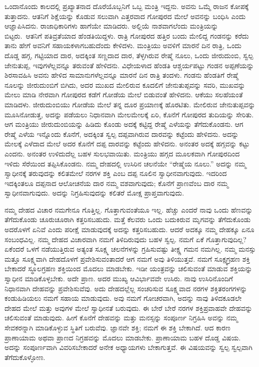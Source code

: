 ಒಂದಾನೊಂದು ಕಾಲದಲ್ಲಿ ಪ್ರಖ್ಯಾತನಾದ ದೊರೆಯೊಬ್ಬನಿಗೆ ಒಬ್ಬ ಮಂತ್ರಿ ಇದ್ದನು. ಅವನು ಒಮ್ಮೆ ರಾಜನ ಕೋಪಕ್ಕೆ ತುತ್ತಾದನು. ಆತನಿಗೆ ಶಿಕ್ಷೆಯನ್ನು ಕೊಡುವ ಸಲುವಾಗಿ ಎತ್ತರವಾದ ಗೋಪುರದ ಮೇಲೆ ಅವನನ್ನು ಬಂಧಿಸಿ ಎಂದು ಆಜ್ಞಾಪಿಸಿದನು. ರಾಜಾಧಿಕಾರಿಗಳು ಹಾಗೆಯೇ ಮಾಡಿದರು. ಅಲ್ಲಿಯೆ ನಾಶವಾಗಲೆಂದು ಮಂತ್ರಿಯನ್ನು ಬಿಟ್ಟರು.\break\ ಆತನಿಗೆ ಪತಿವ್ರತೆಯಾದ ಹೆಂಡತಿಯಿದ್ದಳು. ರಾತ್ರಿ ಗೋಪುರದ ಹತ್ತಿರ ಬಂದು ಮೇಲಿದ್ದ ಗಂಡನನ್ನು ಕರೆದು ತಾನು ಹೇಗೆ ಅವನಿಗೆ ಸಹಾಯಕಳಾಗಬಹುದೆಂದು ಕೇಳಿದಳು. ಮಂತ್ರಿಯು ಅವಳಿಗೆ ಮಾರನೆ ದಿನ ರಾತ್ರಿ, ಒಂದು ದೊಡ್ಡ ಹಗ್ಗ, ಗಟ್ಟಿಯಾದ ದಾರ, ಅದಕ್ಕಿಂತ ಸಣ್ಣದಾದ ದಾರ, ತೆಳ್ಳಗಿರುವ ರೇಷ್ಮೆ ನೂಲು, ಒಂದು ಜೀರುದುಂಬಿ, ಸ್ವಲ್ಪ ಜೇನುತುಪ್ಪ, ಇವುಗಳೆಲ್ಲವನ್ನೂ ತರುವಂತೆ ಹೇಳಿದನು. ವಿಧೇಯಳಾದ ಹೆಂಡತಿ ಆಶ್ಚರ್ಯಪಟ್ಟು ಗಂಡನ ಅಪ್ಪಣೆಯನ್ನು ಶಿರಸಾವಹಿಸಿ ಅವನು ಹೇಳಿದ ಸಾಮಾನುಗಳೆಲ್ಲವನ್ನೂ ಮಾರನೆ ದಿನ ರಾತ್ರಿ ತಂದಳು. ಗಂಡನು ಹೆಂಡತಿಗೆ ರೇಷ್ಮೆ ನೂಲನ್ನು ಜೀರುದುಂಬಿಗೆ ಬಿಗಿದು, ಅದರ ಮುಖದ ಮೇಲಿರುವ ಕೂದಲಿಗೆ ಜೇನುತುಪ್ಪವನ್ನು ಸವರಿ, ಮುಖವನ್ನು ಮೇಲು ಮಾಡಿ ನೇರವಾಗಿ ಗೋಪುರದ ಕಡೆಗೆ ಗೋಡೆಯ ಮೇಲೆ ಬಿಡುವಂತೆ ಹೇಳಿದನು. ಆಕೆಯು ಸಲಹೆಯಂತೆ ಮಾಡಿದಳು. ಜೀರುದುಂಬಿಯು ಗೋಡೆಯ ಮೇಲೆ ತನ್ನ ದೂರ ಪ್ರಯಾಣಕ್ಕೆ ಹೊರಟಿತು. ಮೇಲಿರುವ ಜೇನುತುಪ್ಪವನ್ನು ಮೂಸಿನೋಡುತ್ತ, ಅದನ್ನು ಪಡೆಯಲು ನಿಧಾನವಾಗಿ ಮೇಲಮೇಲಕ್ಕೆ ಏರಿ, ಕೊನೆಗೆ ಗೋಪುರದ ತುದಿಯನ್ನು ಸೇರಿತು. ಆಗ ಮಂತ್ರಿಯು ಜೀರುದುಂಬಿಯನ್ನು ಹಿಡಿದು ಕೊಂಡು ಅದಕ್ಕೆ ಕಟ್ಟಿದ್ದ ರೇಷ್ಮೆ ಎಳೆಯನ್ನು ತೆಗೆದುಕೊಂಡನು. ಆಗ ರೇಷ್ಮೆ ಎಳೆಯ ಇನ್ನೊಂದು ಕೊನೆಗೆ, ಅದಕ್ಕಿಂತ ಸ್ವಲ್ಪ ದಪ್ಪವಾಗಿರುವ ದಾರವನ್ನು ಕಟ್ಟೆಂದು ಹೇಳಿದನು. ಅದನ್ನು ಮೇಲಕ್ಕೆ ಎಳೆದಾದ ಮೇಲೆ ಅದರ ಕೊನೆಗೆ ದಪ್ಪ ದಾರವನ್ನು ಕಟ್ಟೆಂದು ಹೇಳಿದನು. ಅನಂತರ ಅದಕ್ಕೆ ಹಗ್ಗವನ್ನು ಕಟ್ಟು ಎಂದನು. ಅನಂತರ ಉಳಿದುದೆಲ್ಲ ಬಹಳ ಸುಲಭವಾಯಿತು. ಮಂತ್ರಿಯು ಹಗ್ಗದ ಮೂಲಕವಾಗಿ ಗೋಪುರದಿಂದ ಇಳಿದು ಸೆರೆಯಿಂದ ತಪ್ಪಿಸಿಕೊಂಡನು. ನಮ್ಮ ದೇಹದಲ್ಲಿ ಉಸಿರಿನ ಚಲನೆಯೇ “ರೇಷ್ಮೆಯ ನೂಲು.” ಅದನ್ನು ನಮ್ಮ ಸ್ವಾಧೀನಕ್ಕೆ ತರುವುದನ್ನು ಕಲಿತಮೇಲೆ ನರಗಳ ಶಕ್ತಿ ಎಂಬ ದಪ್ಪ ನೂಲಿನ ಸ್ವಾಧೀನವಾಗುವುದು. ಇದರಿಂದ ಇದಕ್ಕಿಂತಲೂ ದಪ್ಪನಾದ ಆಲೋಚನೆಯ ದಾರ ನಮ್ಮ ವಶವಾಗುವುದು; ಕೊನೆಗೆ ಪ್ರಾಣವೆಂಬ ದಾರ ನಮ್ಮ ಸ್ವಾಧೀನವಾಗುವುದು. ಅದನ್ನು ನಿಗ್ರಹಿಸುವುದನ್ನು ಕಲಿತರೆ ಮೋಕ್ಷ ಪ್ರಾಪ್ತವಾಗುವುದು. 

\vskip 0.3cm

ನಮ್ಮ ದೇಹದ ವಿಚಾರ ನಮಗೇನೂ ಗೊತ್ತಿಲ್ಲ. ಗೊತ್ತಾಗುವಂತೆಯೂ ಇಲ್ಲ. ಹೆಚ್ಚು ಎಂದರೆ ನಾವು ಒಂದು ಹೆಣವನ್ನು ತೆಗೆದುಕೊಂಡು ಚೂರುಚೂರಾಗಿ ಕತ್ತರಿಸಬಹುದು. ಮತ್ತೆ ಕೆಲವರು ಒಂದು ಬದುಕಿರುವ ಮೃಗವನ್ನು ತೆಗೆದುಕೊಂಡು ಅದರೊಳಗೆ ಏನಿವೆ ಎಂದು ಪರೀಕ್ಷೆ ಮಾಡುವುದಕ್ಕೆ ಅದನ್ನು ಕತ್ತರಿಸಬಹುದು. ಆದರೆ ಅದಕ್ಕೂ ನಮ್ಮ ದೇಹಕ್ಕೂ ಏನೂ ಸಂಬಂಧವಿಲ್ಲ. ನಮ್ಮ ದೇಹದ ವಿಚಾರವಾಗಿ ನಮಗೆ ತಿಳಿದಿರುವುದು ಬಹಳ ಸ್ವಲ್ಪ. ನಮಗೆ ಏಕೆ ಗೊತ್ತಾಗುವುದಿಲ್ಲ? ಏಕೆಂದರೆ ಒಳಗೆ ನಡೆಯುತ್ತಿರುವ ಅತ್ಯಂತ ಸೂಕ್ಷ್ಮ ಚಲನೆಗಳನ್ನು ಗ್ರಹಿಸುವಷ್ಟು ತೀಕ್ಷ್ಣ ಗಮನ ನಮಗಿಲ್ಲ. ನಮ್ಮ ಮನಸ್ಸು ಮತ್ತೂ ಸೂಕ್ಷ್ಮವಾಗಿ ದೇಹದೊಳಗೆ ಪ್ರವೇಶಿಸುವಂತಾದರೆ ಆಗ ನಮಗೆ ಅವು ತಿಳಿಯುತ್ತವೆ. ನಮಗೆ ಸೂಕ್ಷ್ಮಗ್ರಹಣ ಶಕ್ತಿ ಬೇಕಾದರೆ ಸ್ಥೂಲಗ್ರಹಣ ಶಕ್ತಿಯಿಂದ ಮೊದಲು ಮಾಡಬೇಕು. ಇಡೀ ಯಂತ್ರವನ್ನು ಚಲಿಸುವಂತೆ ಮಾಡುವ ಶಕ್ತಿಯನ್ನು ಸ್ವಾಧೀನ ಮಾಡಿಕೊಳ್ಳಬೇಕು. ಅದೇ ಪ್ರಾಣ. ಅದರ ಮುಖ್ಯ ಆವಿರ್ಭಾವವೇ ಉಸಿರು. ನಾವು ಉಸಿರಿನೊಂದಿಗೆ ನಿಧಾನವಾಗಿ ದೇಹವನ್ನು ಪ್ರವೇಶಿಸುವೆವು. ಅದು ದೇಹದಲ್ಲೆಲ್ಲ ಸಂಚರಿಸುವ ಸೂಕ್ಷ್ಮವಾದ ನರಗಳ ಶಕ್ತಿತರಂಗಗಳನ್ನು ಕಂಡುಹಿಡಿಯಲು ನಮಗೆ ಸಹಾಯ ಮಾಡುವುದು. ಅವು ನಮಗೆ ಗೋಚರವಾಗಿ, ಅದನ್ನು ನಾವು ತಿಳಿದಕೂಡಲೇ ದೇಹದ ಮೇಲೆ ಮತ್ತು ಅವುಗಳ ಮೇಲೆ ಸ್ವಾಧೀನತೆ ಬರುವುದು. ಈ ಬೇರೆ ಬೇರೆ ನರಗಳ ಶಕ್ತಿಪ್ರವಾಹವೇ ದೇಹವನ್ನು ಚಲಿಸುವಂತೆ ಮಾಡುವುದು. ಹೀಗೆ ಕೊನೆಗೆ ದೇಹವನ್ನು ಮತ್ತು ಮನಸ್ಸನ್ನು ಸಂಪೂರ್ಣ ನಿಗ್ರಹಿಸಿ ಅವನ್ನು ನಮ್ಮ ಸೇವಕರನ್ನಾಗಿ ಮಾಡಿಕೊಳ್ಳುವ ಸ್ಥಿತಿಗೆ ಬರುವೆವು. ಜ್ಞಾನವೇ ಶಕ್ತಿ; ನಮಗೆ ಈ ಶಕ್ತಿ ಬೇಕಾಗಿದೆ. ಆದ ಕಾರಣ ಪ್ರಾಣಾಯಾಮ ಅಥವಾ ಪ್ರಾಣದ ನಿಗ್ರಹವನ್ನು ಮೊದಲು ಮಾಡಬೇಕು. ಪ್ರಾಣಾಯಾಮ ಬಹಳ ದೊಡ್ಡ ವಿಷಯ. ಅದನ್ನು ಸಂಪೂರ್ಣವಾಗಿ ವಿವರಿಸಬೇಕಾದರೆ ಅನೇಕ ಅಧ್ಯಾಯಗಳು ಬೇಕಾಗುತ್ತವೆ. ಈ ವಿಷಯವನ್ನು ಸ್ವಲ್ಪ ಸ್ವಲ್ಪವಾಗಿ ತೆಗೆದುಕೊಳ್ಳೋಣ. 

